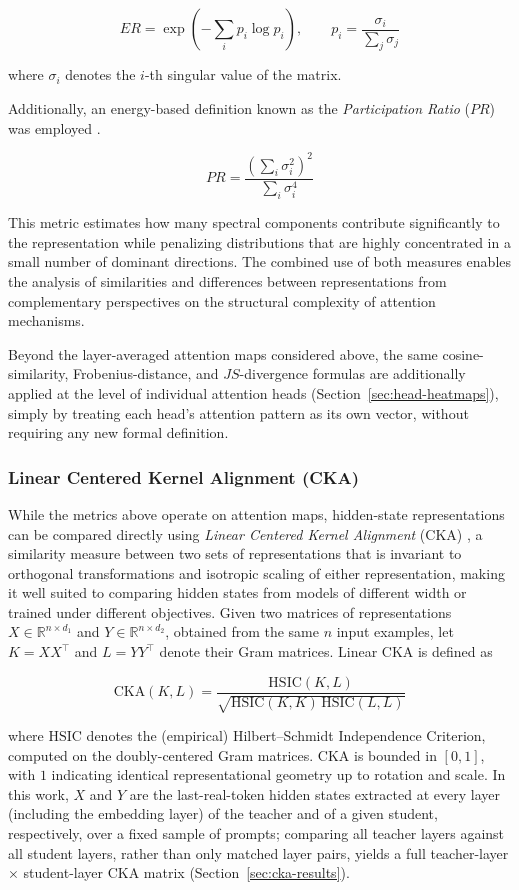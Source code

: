 \documentclass[conference]{IEEEtran}
\begin{document}
\[
ER
=
\exp
\left(
-\sum_i p_i \log p_i
\right),
\qquad
p_i
=
\frac{\sigma_i}{\sum_j \sigma_j}
\]

where $\sigma_i$ denotes the $i$-th singular value of the matrix.

Additionally, an energy-based definition known as the \textit{Participation Ratio} ($PR$) was employed \cite{recanatesi2022scale}.

\[
PR
=
\frac{
\left(
\sum_i \sigma_i^2
\right)^2
}{
\sum_i \sigma_i^4
}
\]

This metric estimates how many spectral components contribute significantly to the representation while penalizing distributions that are highly concentrated in a small number of dominant directions. The combined use of both measures enables the analysis of similarities and differences between representations from complementary perspectives on the structural complexity of attention mechanisms.

Beyond the layer-averaged attention maps considered above, the same cosine-similarity, Frobenius-distance, and $JS$-divergence formulas are additionally applied at the level of individual attention heads (Section~\ref{sec:head-heatmaps}), simply by treating each head's attention pattern as its own vector, without requiring any new formal definition.

\subsubsection{Linear Centered Kernel Alignment (CKA)}\label{sec:cka-def}

While the metrics above operate on attention maps, hidden-state representations can be compared directly using \textit{Linear Centered Kernel Alignment} (CKA) \cite{kornblith2019similarity}, a similarity measure between two sets of representations that is invariant to orthogonal transformations and isotropic scaling of either representation, making it well suited to comparing hidden states from models of different width or trained under different objectives. Given two matrices of representations $X \in \mathbb{R}^{n \times d_1}$ and $Y \in \mathbb{R}^{n \times d_2}$, obtained from the same $n$ input examples, let $K=XX^\top$ and $L=YY^\top$ denote their Gram matrices. Linear CKA is defined as

\[
\mathrm{CKA}(K,L)
=
\frac{\mathrm{HSIC}(K,L)}{\sqrt{\mathrm{HSIC}(K,K)\,\mathrm{HSIC}(L,L)}}
\]

where $\mathrm{HSIC}$ denotes the (empirical) Hilbert--Schmidt Independence Criterion, computed on the doubly-centered Gram matrices. $\mathrm{CKA}$ is bounded in $[0,1]$, with $1$ indicating identical representational geometry up to rotation and scale. In this work, $X$ and $Y$ are the last-real-token hidden states extracted at every layer (including the embedding layer) of the teacher and of a given student, respectively, over a fixed sample of prompts; comparing all teacher layers against all student layers, rather than only matched layer pairs, yields a full teacher-layer $\times$ student-layer CKA matrix (Section~\ref{sec:cka-results}).
\end{document}
